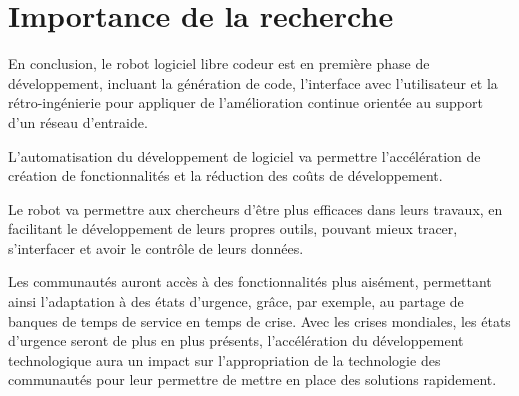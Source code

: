 

\section{Importance de la recherche}
En conclusion, le robot logiciel libre codeur est en première phase de développement, incluant la génération de code, l'interface avec l'utilisateur et la rétro-ingénierie pour appliquer de l'amélioration continue orientée au support d'un réseau d'entraide. 

L’automatisation du développement de logiciel va permettre l’accélération de création de fonctionnalités et la réduction des coûts de développement. 

Le robot va permettre aux chercheurs d’être plus efficaces dans leurs travaux, en facilitant le développement de leurs propres outils, pouvant mieux tracer, s’interfacer et avoir le contrôle de leurs données.

Les communautés auront accès à des fonctionnalités plus aisément, permettant ainsi l'adaptation à des états d'urgence, grâce, par exemple, au partage de banques de temps de service en temps de crise. 
Avec les crises mondiales, les états d’urgence seront de plus en plus présents, l’accélération du développement technologique aura un impact sur l’appropriation de la technologie des communautés pour leur permettre de mettre en place des solutions rapidement.